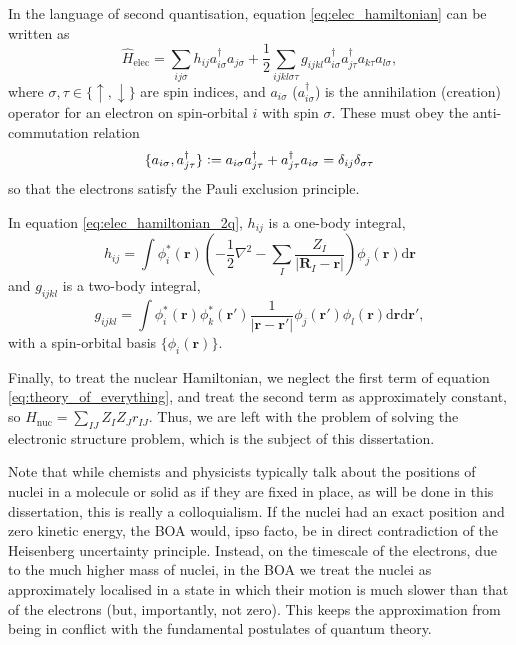 In the language of second quantisation, equation \eqref{eq:elec_hamiltonian} can be written as
\begin{equation}
\label{eq:elec_hamiltonian_2q}
\hat H_\mathrm{elec} = \sum_{ij\sigma} h_{ij}a_{i\sigma}^\dag a_{j\sigma}+\frac 12 \sum_{ijkl\sigma\tau} g_{ijkl}a_{i\sigma}^\dag a_{j\tau}^\dag a_{k\tau}a_{l\sigma},
\end{equation}
where $\sigma,\tau\in\{\uparrow,\downarrow\}$ are spin indices, and $a_{i\sigma}$ ($a_{i\sigma}^\dag$) is the annihilation (creation) operator for an electron on spin-orbital $i$ with spin $\sigma$. These must obey the anti-commutation relation
\begin{equation}
    \{a_{i\sigma},a_{j\tau}^\dag\}
    \mathrel{\mathop:}=
    a_{i\sigma}a_{j\tau}^\dag + a_{j\tau}^\dag a_{i\sigma}
    =\delta_{ij}\delta_{\sigma\tau}
\end{equation}
so that the electrons satisfy the Pauli exclusion principle.

In equation \ref{eq:elec_hamiltonian_2q}, $h_{ij}$ is a one-body integral,
\begin{equation}
\label{eq:hij}
h_{ij} = \int \phi_i^*(\mathbf{r})\left(-\frac 12 \nabla^2 - \sum_I \frac{Z_I}{|\mathbf{R}_I-\mathbf r|}\right)\phi_j(\mathbf{r})\mathrm{d}\mathbf{r}
\end{equation}
and $g_{ijkl}$ is a two-body integral,
\begin{equation}
g_{ijkl} = \int \phi_i^*(\mathbf{r})\phi_k^*(\mathbf{r}')\frac{1}{|\mathbf{r}-\mathbf{r}'|}\phi_j(\mathbf{r}')\phi_l(\mathbf{r})\mathrm{d}\mathbf{r}\mathrm{d}\mathbf{r}',
\end{equation}
with a spin-orbital basis $\{\phi_i(\mathbf{r})\}$.

Finally, to treat the nuclear Hamiltonian, we neglect the first term of equation \eqref{eq:theory_of_everything}, and treat the second term as approximately constant, so $\hat H_\mathrm{nuc} = \sum_{IJ} Z_IZ_Jr_{IJ}$. Thus, we are left with the problem of solving the electronic structure problem, which is the subject of this dissertation.

Note that while chemists and physicists typically talk about the positions of nuclei in a molecule or solid as if they are fixed in place, as will be done in this dissertation, this is really a colloquialism. If the nuclei had an exact position and zero kinetic energy, the \gls{BOA} would, ipso facto, be in direct contradiction of the Heisenberg uncertainty principle. Instead, on the timescale of the electrons, due to the much higher mass of nuclei, in the \gls{BOA} we treat the nuclei as approximately localised in a state in which their motion is much slower than that of the electrons (but, importantly, not zero). This keeps the approximation from being in conflict with the fundamental postulates of quantum theory.

